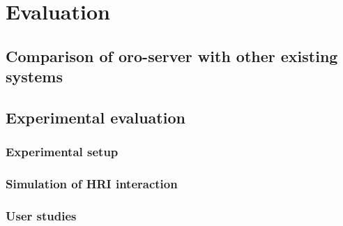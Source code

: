 \chapter{Evaluation}
\label{chapter|evaluation}

\section{Comparison of oro-server with other existing systems}
\label{sect|evaluation-oroserver}

\section{Experimental evaluation}
\label{sect|experimental-evaluation}

\subsection{Experimental setup}
\label{sect|user-experiments}

\subsection{Simulation of HRI interaction}
\label{sect|simulation}


\subsection{User studies}
\label{sect|userstudies}


